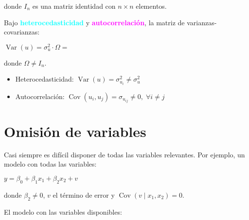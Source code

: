 \documentclass[10pt, a4paper, landscape]{article}
\DeclareMathOperator{\Var}{Var}
\DeclareMathOperator{\Cov}{Cov}
\begin{document}
\begin{multicols}{3}
\quad donde \( I_{n} \) es una matriz identidad con \( n \times n \) elementos.

Bajo \textcolor{cyan}{\textbf{heterocedasticidad}} y \textcolor{magenta}{\textbf{autocorrelación}}, la matriz de varianzas-covarianzas:

\begin{center}
	\( \Var(u) = \sigma_{u}^{2} \cdot \Omega = \)
\end{center}

\quad donde \( \Omega \neq I_{n} \).

\begin{itemize}[leftmargin=*]
	\item Heterocedasticidad: \( \Var(u) = \sigma_{u_{i}}^{2} \neq \sigma_{u}^{2} \)
	\item Autocorrelación: \( \Cov(u_{i}, u_{j}) = \sigma_{u_{ij}} \neq 0, \; \forall i \neq j \)
\end{itemize}

\section*{Omisión de variables}

Casi siempre es difícil disponer de todas las variables relevantes. Por ejemplo, un modelo con todas las variables:

\begin{center}
	\( y = \beta_{0} + \beta_{1} x_{1} + \beta_{2} x_{2} + v \)
\end{center}

\quad donde \( \beta_{2} \neq 0 \), \( v \) el término de error y \( \Cov(v \mid x_{1}, x_{2}) = 0 \).

El modelo con las variables disponibles:


\end{multicols}
\end{document}
